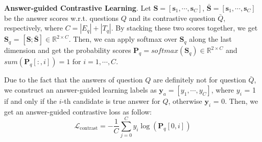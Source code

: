 \documentclass[11pt]{article}
\newcommand{\xhdr}[1]{{\noindent\bfseries #1}.}
\newcommand{\gt}[1]{{{\textcolor{cyan}{[gt: #1]}}}}
\begin{document}

\xhdr{Answer-guided Contrastive Learning} Let $\bm{S} = [\bm{s}_{1}, \cdots, \bm{s}_{C}]$, $\bm{\bar{S}} = [\bm{s}_{1}, \cdots, \bm{s}_{C}]$ be the answer scores w.r.t. questions $Q$ and its contrastive question $\bar{Q}$, respectively, where $C = |E_q| + |T_q|$. By stacking these two scores together, we get $\bm{S}_{q}$ = $[\bm{{S}}; \bm{\bar{S}}]\in \mathbb{R}^{2\times C}$. Then, we can apply softmax over $\bm{S}_{q}$ along the last dimension and get the probability scores $\bm{P}_{q} =softmax(\bm{S}_{q})\in \mathbb{R}^{2\times C}$ and $sum(\bm{P}_{q}[:,i]) = 1$ for $i= 1, \cdots, C$.


Due to the fact that the answers of question ${Q}$ are definitely not for question $\bar{Q}$, we construct an answer-guided learning labels as $\bm{y}_{a} = [y_1,\cdots, y_C]$, where $y_i$ = 1 if and only if the $i$-th candidate is true answer for ${Q}$, otherwise $\bm{y}_i$ = 0. Then, we get an answer-guided contrastive loss as follow:
\begin{equation}
    \mathcal{L}_{\text{contrast}} = -{\frac{1}{C}}\sum_{j=0}^{C}{y}_i\log(\bm{P}_{q}[0,i])
\end{equation}
\end{document}
